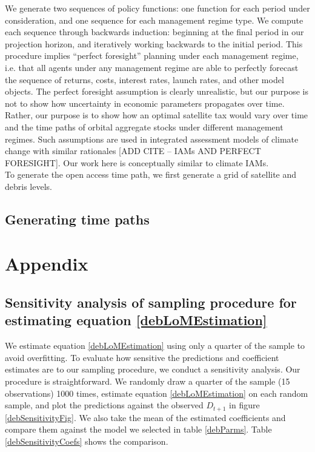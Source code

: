 \documentclass[12pt]{article}
\begin{document}
We generate two sequences of policy functions: one function for each period under consideration, and one sequence for each management regime type. We compute each sequence through backwards induction: beginning at the final period in our projection horizon, and iteratively working backwards to the initial period. This procedure implies ``perfect foresight'' planning under each management regime, i.e. that all agents under any management regime are able to perfectly forecast the sequence of returns, costs, interest rates, launch rates, and other model objects. The perfect foresight assumption is clearly unrealistic, but our purpose is not to show how uncertainty in economic parameters propagates over time. Rather, our purpose is to show how an optimal satellite tax would vary over time and the time paths of orbital aggregate stocks under different management regimes. Such assumptions are used in integrated assessment models of climate change with similar rationales [ADD CITE -- IAMs AND PERFECT FORESIGHT]. Our work here is conceptually similar to climate IAMs. \\

To generate the open access time path, we first generate a grid of satellite and debris levels.

\subsection{Generating time paths}

\newpage

{
	\setlength{\bibsep}{3pt}
	
	
}

\newpage

\section{Appendix}

\subsection{Sensitivity analysis of sampling procedure for estimating equation \ref{debLoMEstimation}}
\label{sensitivity}

We estimate equation \ref{debLoMEstimation} using only a quarter of the sample to avoid overfitting. To evaluate how sensitive the predictions and coefficient estimates are to our sampling procedure, we conduct a sensitivity analysis. Our procedure is straightforward. We randomly draw a quarter of the sample (15 observations) 1000 times, estimate equation \ref{debLoMEstimation} on each random sample, and plot the predictions against the observed $D_{t+1}$ in figure \ref{debSensitivityFig}. We also take the mean of the estimated coefficients and compare them against the model we selected in table \ref{debParms}. Table \ref{debSensitivityCoefs} shows the comparison.
\end{document}
